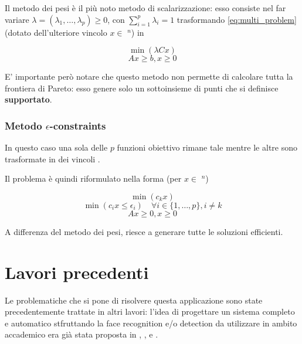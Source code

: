 Il metodo dei pesi è il più noto metodo di scalarizzazione: esso consiste nel far variare 
$\lambda = (\lambda_1, \dots, \lambda_p) \geq 0$, con $\sum_{i=1}^{p} \lambda_i = 1$ trasformando 
\ref{eq:multi_problem} (dotato dell'ulteriore vincolo $x \in$ \Zset$^n$) in 

\begin{equation*}
    \min (\lambda Cx)    
    \label{eq:}
\end{equation*}
\begin{equation*}
    Ax \geq b, x\geq 0
    \label{eq:}
\end{equation*}

E' importante però notare che questo metodo non permette di calcolare tutta la frontiera di Pareto:
esso genere solo un sottoinsieme di punti che si definisce \textbf{supportato}. 

\subsubsection{Metodo $\epsilon$-constraints}
\label{section:epsilon_constraints}

In questo caso una sola delle $p$ funzioni obiettivo rimane tale mentre le altre sono trasformate in 
dei vincoli \cite{Figueira2006}.

Il problema è quindi riformulato nella forma (per $x \in$ \Zset$^n$)

\begin{equation*}
    \min (c_kx)    
    \label{eq:}
\end{equation*}
\begin{equation*}
    \min (c_ix \leq \epsilon_i)  \quad \forall i \in \{1, \dots, p\}, i \neq k   
    \label{eq:}
\end{equation*}
\begin{equation*}
    Ax \geq 0, x \geq 0
    \label{eq:}
\end{equation*}

A differenza del metodo dei pesi, riesce a generare tutte le soluzioni efficienti.

\newpage

\section{Lavori precedenti}
\label{section:past_works}

Le problematiche che si pone di risolvere questa applicazione sono state 
precedentemente trattate in altri lavori: l'idea di progettare un sistema 
completo e automatico stfruttando la face recognition e/o detection
da utilizzare in ambito accademico era già stata proposta in ,
,  e .

